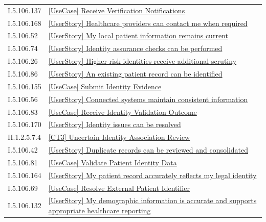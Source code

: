 \begin{longtable}{p{.22\linewidth}p{.73\linewidth}}
I.5.106.137 & \hyperref[element:4da6ad9d47c743048d8852c6ca2e1619]{[UseCase] Receive Verification Notifications} \\
I.5.106.168 & \hyperref[element:4ec5f61108474f0fb135826ddc925bad]{[UserStory] Healthcare providers can contact me when required} \\
I.5.106.52 & \hyperref[element:4f3dd5b4c2264b148330a363ff8d483d]{[UserStory] My local patient information remains current} \\
I.5.106.74 & \hyperref[element:4fd7f319ee2b4114b4b4650dd4bfa833]{[UserStory] Identity assurance checks can be performed} \\
I.5.106.26 & \hyperref[element:50a222a114ed4dae847b82a5b7e87dd2]{[UserStory] Higher-risk identities receive additional scrutiny} \\
I.5.106.86 & \hyperref[element:50ecdad9af824100b69bf34668c780a0]{[UserStory] An existing patient record can be identified} \\
I.5.106.155 & \hyperref[element:5308c51023c4444fbb6db3a56064becd]{[UseCase] Submit Identity Evidence} \\
I.5.106.56 & \hyperref[element:5384c92855174dc481ac5c6275a3be76]{[UserStory] Connected systems maintain consistent information} \\
I.5.106.83 & \hyperref[element:53d058d657ce48d9bffa4e86f4b85550]{[UseCase] Receive Identity Validation Outcome} \\
I.5.106.170 & \hyperref[element:55529795d5844d35ad53e45ed4e91dc0]{[UserStory] Identity issues can be resolved} \\
II.1.2.5.7.4 & \hyperref[element:557cb77968f642a9b505fe22705b7f16]{[CT3] Uncertain Identity Association Review} \\
I.5.106.42 & \hyperref[element:596efe2352e2470e97d8383488bd0a67]{[UserStory] Duplicate records can be reviewed and consolidated} \\
I.5.106.81 & \hyperref[element:5a222ab9f40e474ebaac38a1e6892c5a]{[UseCase] Validate Patient Identity Data} \\
I.5.106.164 & \hyperref[element:5adbb01596fa4e02ba51934192de89ae]{[UserStory] My patient record accurately reflects my legal identity} \\
I.5.106.69 & \hyperref[element:5b72f5e068cd49dfac8a391796b7d1c9]{[UseCase] Resolve External Patient Identifier} \\
I.5.106.132 & \hyperref[element:5bbc384cf23c49c58751f01cd01f6bb5]{[UserStory] My demographic information is accurate and supports appropriate healthcare reporting} \\

\end{longtable}
